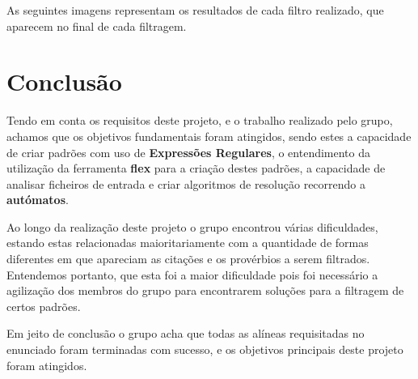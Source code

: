 \documentclass[11pt,a4paper]{report}
\begin{document}
As seguintes imagens representam os resultados de cada filtro realizado, que aparecem no final de cada filtragem.



\chapter{Conclusão}
\label{chap:concl}

Tendo em conta os requisitos deste projeto, e o trabalho realizado pelo grupo, achamos que os objetivos fundamentais foram atingidos, sendo estes a capacidade de criar padrões com uso de \textbf{Expressões Regulares}, o entendimento da utilização da ferramenta \textbf{flex} para a criação destes padrões, a capacidade de analisar ficheiros de entrada e criar algoritmos de resolução recorrendo a \textbf{autómatos}.

Ao longo da realização deste projeto o grupo encontrou várias dificuldades, estando estas relacionadas maioritariamente com a quantidade de formas diferentes em que apareciam as citações e os provérbios a serem filtrados. Entendemos portanto, que esta foi a maior dificuldade pois foi necessário a agilização dos membros do grupo para encontrarem soluções para a filtragem de certos padrões.

Em jeito de conclusão o grupo acha que todas as alíneas requisitadas no enunciado foram terminadas com sucesso, e os objetivos principais deste projeto foram atingidos.
\end{document}
